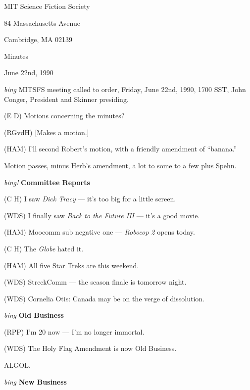 \setlength{\topmargin}{-0.5in}
\setlength{\oddsidemargin}{0.0in}
\setlength{\evensidemargin}{0.0in}
\setlength{\textheight}{9in}
\setlength{\textwidth}{6.5in}



\begin{center}
MIT Science Fiction Society

84 Massachusetts Avenue

Cambridge, MA 02139

\vspace{0.2in}
Minutes

June 22nd, 1990

\end{center}
 
\vspace{0.15in}
{\em bing\/}  MITSFS meeting called to order, Friday, June 22nd, 1990,
1700 SST, John Conger, President and Skinner presiding.

(E D) Motions concerning the minutes?

(RGvdH) [Makes a motion.]

(HAM) I'll second Robert's motion, with a friendly amendment of ``banana.''

Motion passes, minus Herb's amendment, a lot to some to a few plus Spehn.

\vspace{.15in}
{\em bing!\/}  {\bf Committee Reports\/}

(C H) I saw {\em Dick Tracy\/} --- it's too big for a little screen.

(WDS) I finally saw {\em Back to the Future III\/} --- it's a good movie.

(HAM) Moocomm sub negative one --- {\em Robocop 2\/} opens today.

(C H) The {\em Globe\/} hated it.

(HAM) All five Star Treks are this weekend.

(WDS) StreckComm --- the season finale is tomorrow night.

(WDS) Cornelia Otis: Canada may be on the verge of dissolution.

\vspace{.15in}
{\em bing\/} {\bf Old Business\/}

(RPP) I'm 20 now --- I'm no longer immortal.

(WDS) The Holy Flag Amendment is now Old Business.

ALGOL.

\vspace{0.15in}
{\em bing\/} {\bf New Business\/}

